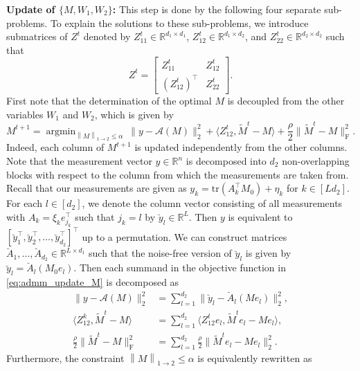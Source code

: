 \documentclass[11pt]{article}
\newcommand{\norm}[1]{\left \|#1 \right \|}
\begin{document}
\noindent\noindent\textbf{Update of $\{M, W_1, W_2\}$:} This step is done by the following four separate sub-problems. 
To explain the solutions to these sub-problems, we introduce submatrices of $Z^t$ denoted by $Z_{11}^t \in \mathbb{R}^{d_1 \times d_1}$, $Z_{12}^t \in \mathbb{R}^{d_1 \times d_2}$, and $Z_{22}^t \in \mathbb{R}^{d_2 \times d_2}$ such that 
\[
Z^t = \begin{bmatrix}
Z_{11}^t & Z_{12}^t \\
\left(Z_{12}^t\right)^\top & Z_{22}^t
\end{bmatrix}.
\]
First note that the determination of the optimal $M$ is decoupled from the other variables $W_1$ and $W_2$, which is given by
\begin{equation}
\label{eq:admm_update_M}
M^{t+1} = \mathop{\mathrm{argmin}}_{ \norm{M}_{1\to 2} \leq \alpha} \ \|y - \mathcal{A}(M)\|_2^2  + \langle Z_{12}^{t}, \widetilde{M}^{t} - M \rangle +\frac{\rho}{2} \|\widetilde{M}^{t} - M\|_\mathrm{F}^2.
\end{equation}
Indeed, each column of $M^{t+1}$ is updated independently from the other columns. 
Note that the measurement vector $y \in \mathbb{R}^n$ is decomposed into $d_2$ non-overlapping blocks with respect to the column from which the measurements are taken from. Recall that our measurements are given as $y_k = \mathrm{tr}(A_k^\top M_0) + \eta_k$ for $k \in [Ld_2]$. 
For each $l \in [d_2]$, we denote the column vector consisting of all measurements with $A_k = \xi_k e_{j_k}^\top$ such that $j_k = l$ by $\breve{y}_l \in \mathbb{R}^L$. 
Then $y$ is equivalent to $[\breve{y}_1^\top, \breve{y}_2^\top, \dots, \breve{y}_{d_2}^\top]^\top$ up to a permutation. We can construct matrices $\breve{A}_1, \dots, \breve{A}_{d_2} \in \mathbb{R}^{L \times d_1}$ such that the noise-free version of $\breve{y}_l$ is given by $\breve{y}_l = \breve{A}_l (M_0 e_l)$. 
Then each summand in the objective function in \eqref{eq:admm_update_M} is decomposed as
\begin{align*}
\|y - \mathcal{A}(M)\|_2^2 &= \sum_{l=1}^{d_2} \|\breve{y}_l - \breve{A}_l(M e_l)\|_2^2, \\
\langle Z_{12}^{k}, \widetilde{M}^{t} - M \rangle
&= \sum_{l=1}^{d_2} \langle Z_{12}^{t} e_l, \widetilde{M}^{t} e_l - M e_l \rangle, \\
\frac{\rho}{2} \big\|\widetilde{M}^t - M\big\|_\mathrm{F}^2 
&= \sum_{l=1}^{d_2} \frac{\rho}{2} \big\|\widetilde{M}^t e_l - M e_l\big\|_2^2.
\end{align*}
Furthermore, the constraint $\norm{M}_{1 \to 2} \leq \alpha$ is equivalently rewritten as 
\end{document}
